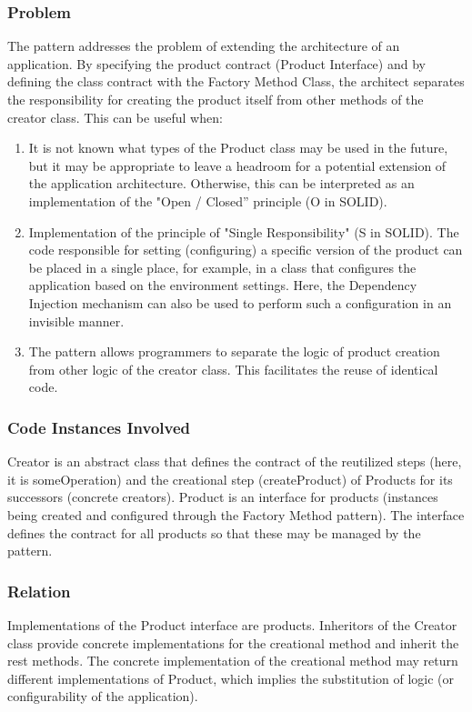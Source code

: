 \documentclass[12pt]{book}
\begin{document}
\subsubsection{Problem}
The pattern addresses the problem of extending the architecture of an application. By specifying  the product contract (Product Interface) and by defining the class contract with the Factory Method Class, the architect separates the responsibility for creating the product itself from other methods of the creator class. This can be useful when:
\begin{enumerate}
    \item It is not known what types of the Product class may be used in the future, but it may be appropriate to leave a headroom for a potential extension of the application architecture. Otherwise, this can be interpreted as an implementation of the "Open / Closed” principle (O in SOLID).
    \item Implementation of the principle of "Single Responsibility" (S in SOLID). The code responsible for setting (configuring) a specific version of the product can be placed in a single place, for example, in a class that configures the application based on the environment settings. Here, the Dependency Injection mechanism can also be used to perform such a configuration in an invisible manner.
    \item The pattern allows programmers to separate the logic of product creation from other logic of the creator class. This facilitates the reuse of identical code.
\end{enumerate}


\subsubsection{Code Instances Involved}
Creator is an abstract class that defines the contract of the reutilized steps (here, it is someOperation) and the creational step (createProduct) of Products for its successors (concrete creators). 
Product is an interface for products (instances being created and configured through the Factory Method pattern). The interface defines the contract for all products so that these may be managed by the pattern.

\subsubsection{Relation}
Implementations of the Product interface are products. Inheritors of the Creator class provide concrete implementations for the creational method and inherit the rest methods. The concrete implementation of the creational method may return different implementations of Product, which implies the substitution of logic (or configurability of the application). 
\end{document}
